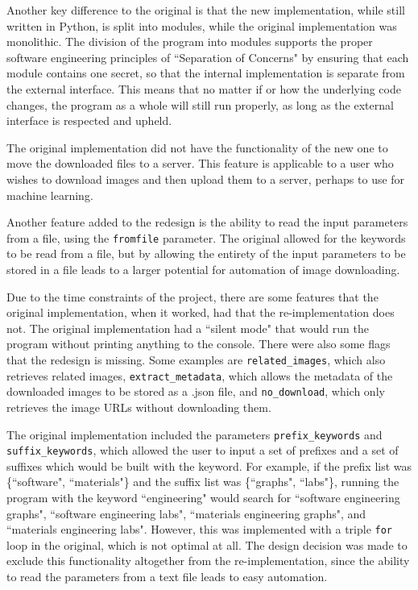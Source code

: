 \documentclass[12pt, titlepage]{article}
\begin{document}
Another key difference to the original is that the new implementation, while still written in Python, is split into modules, while the original implementation was monolithic. The division of the program into modules supports the proper software engineering principles of ``Separation of Concerns" by ensuring that each module contains one secret, so that the internal implementation is separate from the external interface. This means that no matter if or how the underlying code changes, the program as a whole will still run properly, as long as the external interface is respected and upheld.

The original implementation did not have the functionality of the new one to move the downloaded files to a server. This feature is applicable to a user who wishes to download images and then upload them to a server, perhaps to use for machine learning.

Another feature added to the redesign is the ability to read the input parameters from a file, using the \texttt{fromfile} parameter. The original allowed for the keywords to be read from a file, but by allowing the entirety of the input parameters to be stored in a file leads to a larger potential for automation of image downloading.

Due to the time constraints of the project, there are some features that the original implementation, when it worked, had that the re-implementation does not. The original implementation had a ``silent mode" that would run the program without printing anything to the console. There were also some flags that the redesign is missing. Some examples are \texttt{related\_images}, which also retrieves related images, \texttt{extract\_metadata}, which allows the metadata of the downloaded images to be stored as a .json file, and \texttt{no\_download}, which only retrieves the image URLs without downloading them.

The original implementation included the parameters \texttt{prefix\_keywords} and \texttt{suffix\_keywords}, which allowed the user to input a set of prefixes and a set of suffixes which would be built with the keyword. For example, if the prefix list was \{``software", ``materials"\} and the suffix list was \{``graphs", ``labs"\}, running the program with the keyword ``engineering" would search for ``software engineering graphs", ``software engineering labs", ``materials engineering graphs", and ``materials engineering labs". However, this was implemented with a triple \texttt{for} loop in the original, which is not optimal at all. The design decision was made to exclude this functionality altogether from the re-implementation, since the ability to read the parameters from a text file leads to easy automation.
\end{document}
